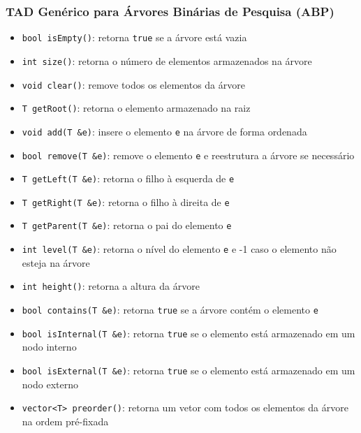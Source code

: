 \documentclass[aspectratio=169]{beamer}
\begin{document}
\begin{frame}\frametitle{TAD Genérico para Árvores Binárias de Pesquisa (ABP)}
\begin{itemize}
	\scriptsize
	\item \texttt{bool isEmpty()}: retorna \texttt{true} se a árvore está vazia\\
	\item \texttt{int size()}: retorna o número de elementos armazenados na árvore\\
	\item \texttt{void clear()}: remove todos os elementos da árvore\\
	\item \texttt{T getRoot()}: retorna o elemento armazenado na raiz\\
	\item \texttt{void add(T \&e)}: insere o elemento \texttt{e} na árvore de forma ordenada\\
	\item \texttt{bool remove(T \&e)}: remove o elemento \texttt{e} e reestrutura a árvore se necessário\\
	\item \texttt{T getLeft(T \&e)}: retorna o filho à esquerda de \texttt{e}\\
	\item \texttt{T getRight(T \&e)}: retorna o filho à direita de \texttt{e}\\
	\item \texttt{T getParent(T \&e)}: retorna o pai do elemento \texttt{e}\\
	\item \texttt{int level(T \&e)}: retorna o nível do elemento \texttt{e} e -1 caso o elemento não esteja na árvore\\
	\item \texttt{int height()}: retorna a altura da árvore\\
	\item \texttt{bool contains(T \&e)}: retorna \texttt{true} se a árvore contém o elemento \texttt{e}\\
	\item \texttt{bool isInternal(T \&e)}: retorna \texttt{true} se o elemento está armazenado em um nodo interno\\
	\item \texttt{bool isExternal(T \&e)}: retorna \texttt{true} se o elemento está armazenado em um nodo externo\\
	\item \texttt{vector<T> preorder()}: retorna um vetor com todos os elementos da árvore na ordem pré-fixada\\

\end{itemize}
\end{frame}
\end{document}
